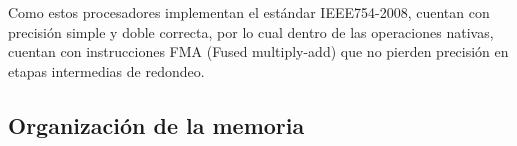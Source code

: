 Como estos procesadores implementan el est\'andar IEEE754-2008, cuentan con precisi\'on simple y
doble correcta, por lo cual dentro de las operaciones nativas, cuentan con instrucciones FMA
(Fused multiply-add) que no pierden precisi\'on en etapas intermedias de redondeo.






\subsection{Organizaci\'on de la memoria}

